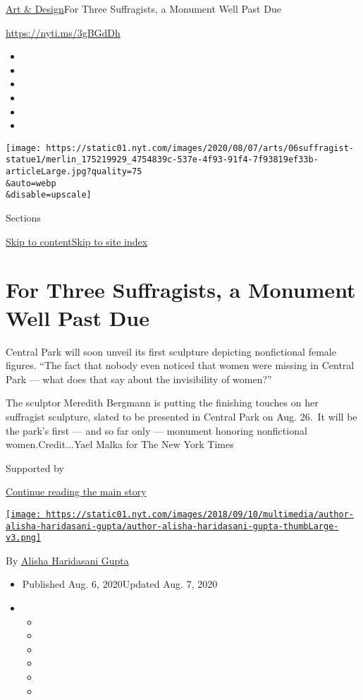 \href{/section/arts/design}{Art \& Design}\textbar{}For Three
Suffragists, a Monument Well Past Due

\href{https://nyti.ms/3gBGdDh}{https://nyti.ms/3gBGdDh}

\begin{itemize}
\item
\item
\item
\item
\item
\item
\end{itemize}

\texttt{[image: https://static01.nyt.com/images/2020/08/07/arts/06suffragist-statue1/merlin\_175219929\_4754839c-537e-4f93-91f4-7f93819ef33b-articleLarge.jpg?quality=75\\\&auto=webp\\\&disable=upscale]}

Sections

\protect\hyperlink{site-content}{Skip to
content}\protect\hyperlink{site-index}{Skip to site index}

\hypertarget{for-three-suffragists-a-monument-well-past-due}{%
\section{For Three Suffragists, a Monument Well Past
Due}\label{for-three-suffragists-a-monument-well-past-due}}

Central Park will soon unveil its first sculpture depicting nonfictional
female figures. ``The fact that nobody even noticed that women were
missing in Central Park --- what does that say about the invisibility of
women?''

The sculptor Meredith Bergmann is putting the finishing touches on her
suffragist sculpture, slated to be presented in Central Park on Aug.
26.~It will be the park's first --- and so far only --- monument
honoring nonfictional women.Credit...Yael Malka for The New York Times

Supported by

\protect\hyperlink{after-sponsor}{Continue reading the main story}

\href{https://www.nytimes.com/by/alisha-haridasani-gupta}{\texttt{[image: https://static01.nyt.com/images/2018/09/10/multimedia/author-alisha-haridasani-gupta/author-alisha-haridasani-gupta-thumbLarge-v3.png]}}

By \href{https://www.nytimes.com/by/alisha-haridasani-gupta}{Alisha
Haridasani Gupta}

\begin{itemize}
\item
  Published Aug. 6, 2020Updated Aug. 7, 2020
\item
  \begin{itemize}
  \item
  \item
  \item
  \item
  \item
  \item
  \end{itemize}
\end{itemize}

